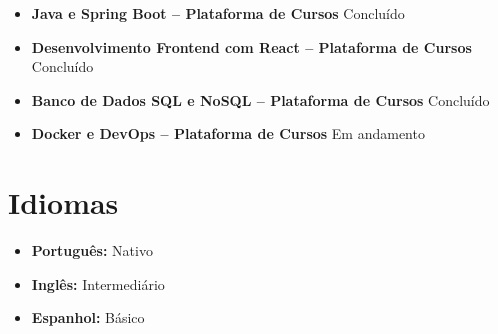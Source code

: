 \documentclass[a4paper,10pt]{article}
\begin{document}
\begin{itemize}[itemsep=0.03em, topsep=0.08em]

    \item \textbf{Java e Spring Boot -- Plataforma de Cursos}
    \hfill
    Concluído

    \item \textbf{Desenvolvimento Frontend com React -- Plataforma de Cursos}
    \hfill
    Concluído

    \item \textbf{Banco de Dados SQL e NoSQL -- Plataforma de Cursos}
    \hfill
    Concluído

    \item \textbf{Docker e DevOps -- Plataforma de Cursos}
    \hfill
    Em andamento

\end{itemize}


\section{Idiomas}

\begin{itemize}[itemsep=0.03em, topsep=0.08em]

    \item \textbf{Português:} Nativo

    \item \textbf{Inglês:} Intermediário

    \item \textbf{Espanhol:} Básico

\end{itemize}
\end{document}
